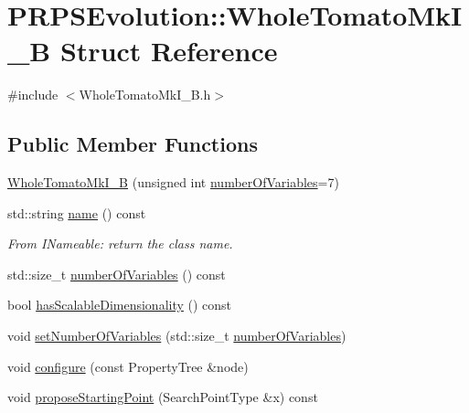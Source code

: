 \hypertarget{struct_p_r_p_s_evolution_1_1_whole_tomato_mk_i___b}{\section{\-P\-R\-P\-S\-Evolution\-:\-:\-Whole\-Tomato\-Mk\-I\-\_\-\-B \-Struct \-Reference}
\label{struct_p_r_p_s_evolution_1_1_whole_tomato_mk_i___b}
}


{\ttfamily \#include $<$\-Whole\-Tomato\-Mk\-I\-\_\-\-B.\-h$>$}

\subsection*{\-Public \-Member \-Functions}
\begin{DoxyCompactItemize}
\item 
\hyperlink{struct_p_r_p_s_evolution_1_1_whole_tomato_mk_i___b_a24d5b9158fa8b54a7cd302703a921db1}{\-Whole\-Tomato\-Mk\-I\-\_\-\-B} (unsigned int \hyperlink{struct_p_r_p_s_evolution_1_1_whole_tomato_mk_i___b_a86d74b13afe219afb30e5ffe0682396b}{number\-Of\-Variables}=7)
\item 
std\-::string \hyperlink{struct_p_r_p_s_evolution_1_1_whole_tomato_mk_i___b_ad13199eb2dccd7535cda15e178670c6a}{name} () const 
\begin{DoxyCompactList}\small\item\em \-From \-I\-Nameable\-: return the class name. \end{DoxyCompactList}\item 
std\-::size\-\_\-t \hyperlink{struct_p_r_p_s_evolution_1_1_whole_tomato_mk_i___b_a86d74b13afe219afb30e5ffe0682396b}{number\-Of\-Variables} () const 
\item 
bool \hyperlink{struct_p_r_p_s_evolution_1_1_whole_tomato_mk_i___b_a9c2efa55ef90b4ca18b29c77ae238750}{has\-Scalable\-Dimensionality} () const 
\item 
void \hyperlink{struct_p_r_p_s_evolution_1_1_whole_tomato_mk_i___b_a3ea23e140cfc4bb03257d5852590fe52}{set\-Number\-Of\-Variables} (std\-::size\-\_\-t \hyperlink{struct_p_r_p_s_evolution_1_1_whole_tomato_mk_i___b_a86d74b13afe219afb30e5ffe0682396b}{number\-Of\-Variables})
\item 
void \hyperlink{struct_p_r_p_s_evolution_1_1_whole_tomato_mk_i___b_af6f64a40df08d7f0974275737aeff17b}{configure} (const \-Property\-Tree \&node)
\item 
void \hyperlink{struct_p_r_p_s_evolution_1_1_whole_tomato_mk_i___b_aedb91d6c4b7cc9d45f8fdb986220b4f9}{propose\-Starting\-Point} (\-Search\-Point\-Type \&x) const 

\end{DoxyCompactItemize}
